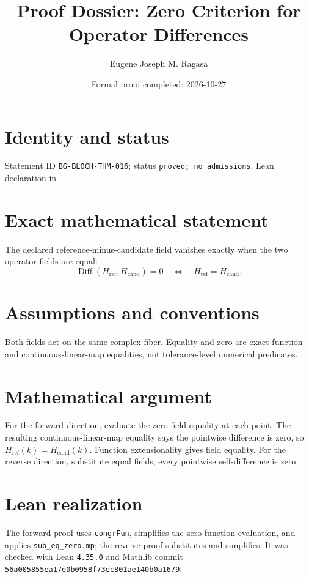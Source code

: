 \documentclass[11pt]{article}
\title{Proof Dossier: Zero Criterion for Operator Differences}
\author{Eugene Joseph M. Ragasa}
\date{Formal proof completed: 2026-10-27}
\begin{document}
\raggedright
\maketitle

\section{Identity and status}
Statement ID \texttt{BG-BLOCH-THM-016}; status \texttt{proved; no admissions}. Lean declaration
 in
.

\section{Exact mathematical statement}
The declared reference-minus-candidate field vanishes exactly when the two operator fields are
equal:
\[
  \operatorname{Diff}(H_{\mathrm{ref}},H_{\mathrm{cand}})=0
  \quad\Longleftrightarrow\quad
  H_{\mathrm{ref}}=H_{\mathrm{cand}}.
\]

\section{Assumptions and conventions}
Both fields act on the same complex fiber. Equality and zero are exact function and
continuous-linear-map equalities, not tolerance-level numerical predicates.

\section{Mathematical argument}
For the forward direction, evaluate the zero-field equality at each point. The resulting
continuous-linear-map equality says the pointwise difference is zero, so
$H_{\mathrm{ref}}(k)=H_{\mathrm{cand}}(k)$. Function extensionality gives field equality. For
the reverse direction, substitute equal fields; every pointwise self-difference is zero.

\section{Lean realization}
The forward proof uses \texttt{congrFun}, simplifies the zero function evaluation, and applies
\texttt{sub\_eq\_zero.mp}; the reverse proof substitutes and simplifies. It was checked with Lean
\texttt{4.35.0} and Mathlib commit
\texttt{56a005855ea17e0b0958f73ec801ae140b0a1679}.
\end{document}
